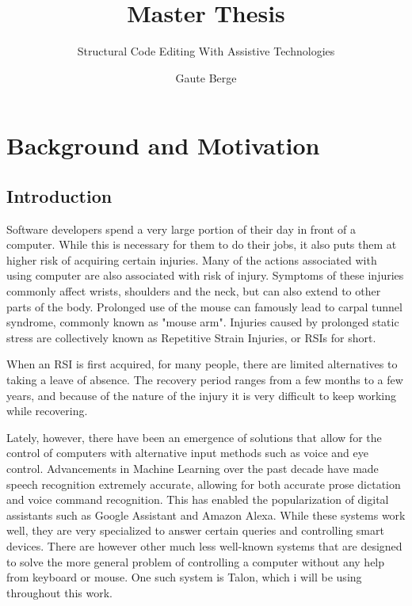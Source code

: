 \documentclass[a4paper,english]{ifimaster}
\title{Master Thesis}
\subtitle{Structural Code Editing With Assistive Technologies}
\author{Gaute Berge}
\begin{document}
\duoforside[dept={Department of Informatics},
program={Informatics: Programming and System Architecture},
long]

\frontmatter{}

\tableofcontents{}


\mainmatter{}
\chapter{Background and Motivation}

\section{Introduction}
Software developers spend a very large portion of their day in front of a computer.
While this is necessary for them to do their jobs, it also puts them at higher risk of acquiring certain injuries.
Many of the actions associated with using computer are also associated with risk of injury.
Symptoms of these injuries commonly affect wrists, shoulders and the neck, but can also extend to other parts of the body.
Prolonged use of the mouse can famously lead to carpal tunnel syndrome, commonly known as "mouse arm".
Injuries caused by prolonged static stress are collectively known as Repetitive Strain Injuries, or RSIs for short.

When an RSI is first acquired, for many people, there are limited alternatives to taking a leave of absence.
The recovery period ranges from a few months to a few years, and because of the nature of the injury
it is very difficult to keep working while recovering.

Lately, however, there have been an emergence of solutions that allow for the control of computers
with alternative input methods such as voice and eye control.
Advancements in Machine Learning over the past decade have made speech recognition extremely accurate,
allowing for both accurate prose dictation and voice command recognition.
This has enabled the popularization of digital assistants such as Google Assistant and Amazon Alexa.
While these systems work well, they are very specialized to answer certain queries and controlling smart devices.
There are however other much less well-known systems that are designed to solve the more general problem
of controlling a computer without any help from keyboard or mouse.
One such system is Talon, which i will be using throughout this work.
\end{document}
